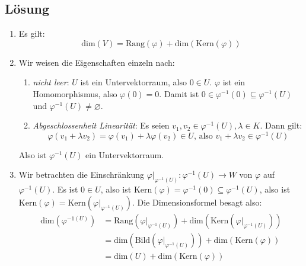 \subsection{Lösung}
\begin{enumerate}
	\item Es gilt: 
	\begin{equation*}
	 	\text{dim}(V) = \text{Rang}(\varphi) + \text{dim}(\text{Kern}(\varphi))
	 \end{equation*} 

	 \item Wir weisen die Eigenschaften einzeln nach:
	 \begin{enumerate}
	 	\item \emph{nicht leer}: \( U \) ist ein Untervektorraum, also \( 0 \in U \). \( \varphi \) ist ein Homomorphismus, also \( \varphi(0) = 0 \). Damit ist \( 0 \in \varphi^{-1}(0) \subseteq \varphi^{-1}(U) \) und \( \varphi^{-1}(U) \neq \varnothing \). 
	 	\item \emph{Abgeschlossenheit Linearität}: Es seien \( v_1, v_2 \in \varphi^{-1}(U), \lambda \in K \). Dann gilt:
	 	\begin{equation*}
	 		\varphi(v_1 + \lambda v_2) = \varphi(v_1) + \lambda \varphi(v_2) \in U\text{, also } v_1 + \lambda v_2 \in \varphi^{-1}(U)
	 	\end{equation*}
	 \end{enumerate}
 	Also ist \( \varphi^{-1}(U) \) ein Untervektorraum.

 	\item Wir betrachten die Einschränkung \( \varphi |_{\varphi^{-1}(U)}: \varphi^{-1}(U) \to W \) von \( \varphi \) auf \( \varphi^{-1}(U) \). Es ist \( 0 \in U \), also ist \( \text{Kern}(\varphi) = \varphi^{-1}(0) \subseteq \varphi^{-1}(U) \), also ist \( \text{Kern}(\varphi) = \text{Kern}(\varphi |_{\varphi^{-1}(U)}) \). Die Dimensionsformel besagt also:
 	\begin{align*}
 		\text{dim}(\varphi^{-1(U)}) &= \text{Rang}(\varphi |_{\varphi^{-1}(U)}) + \text{dim}(\text{Kern}(\varphi |_{\varphi^{-1}(U)})) \\
 		 &= \text{dim}(\text{Bild}(\varphi |_{\varphi^{-1}(U)})) + \text{dim}(\text{Kern}(\varphi)) \\
 		 &= \text{dim}(U) + \text{dim}(\text{Kern}(\varphi))
 	\end{align*}
\end{enumerate}

\newpage

